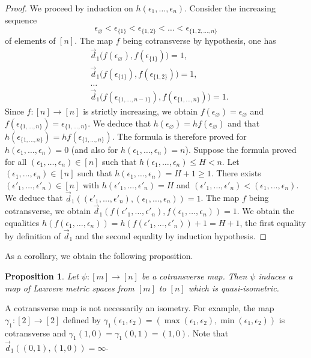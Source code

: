 \documentclass[a4paper,12pt]{amsart}
\renewcommand{\vec}{\overrightarrow}
\newtheorem{prop}[thm]{Proposition}
\newcommand{\bp}{\begin{prop}}
\newcommand{\ep}{\end{prop}}
\newcommand{\bpf}{\begin{proof}}
\newcommand{\epf}{\end{proof}}
\theoremstyle{definition}
\renewcommand{\leq}{\leqslant}
\renewcommand{\geq}{\geqslant}
\newcommand{\vd}{\vec{d}\!_1}
\begin{document}
\bpf
We proceed by induction on $h(\epsilon_1,\dots,\epsilon_n)$. Consider the increasing sequence \[\epsilon_\varnothing< \epsilon_{\{1\}}<\epsilon_{\{1,2\}}<\dots< \epsilon_{\{1,2,\dots,n\}}\] of elements of $[n]$. The map $f$ being cotransverse by hypothesis, one has 
\begin{align*}
	&\vd\big(f(\epsilon_\varnothing),f(\epsilon_{\{1\}})\big) = 1,\\
	&\vd\big(f(\epsilon_{\{1\}}),f(\epsilon_{\{1,2\}})\big) = 1,\\
	& \dots \\
	&\vd\big(f(\epsilon_{\{1,\dots,n-1\}}),f(\epsilon_{\{1,\dots,n\}})\big) = 1.
\end{align*}
Since $f:[n]\to [n]$ is strictly increasing, we obtain $f(\epsilon_\varnothing)=\epsilon_\varnothing$ and $f(\epsilon_{\{1,\dots,n\}}) = \epsilon_{\{1,\dots,n\}}$. We deduce that $h(\epsilon_\varnothing)=hf(\epsilon_\varnothing)$ and that $h(\epsilon_{\{1,\dots,n\}})=hf(\epsilon_{\{1,\dots,n\}})$. The formula is therefore proved for $h(\epsilon_1,\dots,\epsilon_n)=0$ (and also for $h(\epsilon_1,\dots,\epsilon_n)=n$). Suppose the formula proved for all $(\epsilon_1,\dots,\epsilon_n)\in [n]$ such that $h(\epsilon_1,\dots,\epsilon_n)\leq H<n$. Let $(\epsilon_1,\dots,\epsilon_n)\in [n]$ such that $h(\epsilon_1,\dots,\epsilon_n)=H+1 \geq 1$. There exists $(\epsilon'_1,\dots,\epsilon'_n)\in [n]$ with $h(\epsilon'_1,\dots,\epsilon'_n)=H$ and $(\epsilon'_1,\dots,\epsilon'_n)<(\epsilon_1,\dots,\epsilon_n)$. We deduce that $\vd((\epsilon'_1,\dots,\epsilon'_n),(\epsilon_1,\dots,\epsilon_n))=1$. The map $f$ being cotransverse, we obtain $\vd(f(\epsilon'_1,\dots,\epsilon'_n),f(\epsilon_1,\dots,\epsilon_n))=1$. We obtain the equalities $h(f(\epsilon_1,\dots,\epsilon_n))=h(f(\epsilon'_1,\dots,\epsilon'_n))+1 = H+1$, the first equality by definition of $\vd$ and the second equality by induction hypothesis. 
\epf

As a corollary, we obtain the following proposition.


\bp \label{pseudoiso-dis}
Let $\psi:[m]\to [n]$ be a cotransverse map. Then $\psi$ induces a map of Lawvere metric spaces from $[m]$ to $[n]$ which is quasi-isometric.
\ep

A cotransverse map is not necessarily an isometry. For example, the map $\gamma_1:[2] \rightarrow [2]$ defined by $\gamma_1(\epsilon_1,\epsilon_2) = (\max(\epsilon_1,\epsilon_2),\min(\epsilon_1,\epsilon_2))$ is cotransverse and $\gamma_1(1,0) = \gamma_1(0,1) = (1,0)$. Note that $\vd((0,1),(1,0))=\infty$.
\end{document}
